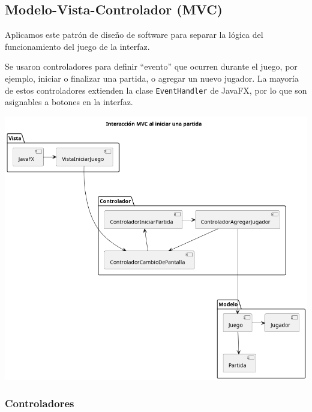 \documentclass[titlepage,a4paper]{article}
\begin{document}
\subsection{Modelo-Vista-Controlador (MVC)}
\label{sec:org0ce8c10}

Aplicamos este patrón de diseño de software para separar la lógica del
funcionamiento del juego de la interfaz.

Se usaron controladores para definir “evento” que ocurren durante el
juego, por ejemplo, iniciar o finalizar una partida, o agregar un
nuevo jugador. La mayoría de estos controladores extienden la clase
\texttt{EventHandler} de JavaFX, por lo que son asignables a botones en la
interfaz.

\begin{center}
\includegraphics[width=.9\linewidth]{./diagramas/mvc-partida.png}
\end{center}

\subsubsection{Controladores}
\label{sec:org7882657}
\end{document}
